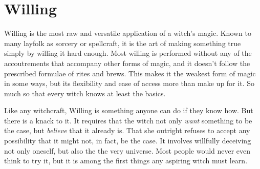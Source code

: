 \chapter{Willing}

Willing is the most raw and versatile application of a witch's magic.
Known to many layfolk as sorcery or spellcraft, it is the art of making something true simply by willing it hard enough.
Most willing is performed without any of the accoutrements that accompany other forms of magic, and it doesn't follow the prescribed formulae of rites and brews.
This makes it the weakest form of magic in some ways, but its flexibility and ease of access more than make up for it.
So much so that every witch knows at least the basics.

Like any witchcraft, Willing is something anyone can do if they know how.
But there is a knack to it.
It requires that the witch not only \emph{want} something to be the case, but \emph{believe} that it already is.
That she outright refuses to accept any possibility that it might not, in fact, be the case.
It involves willfully deceiving not only oneself, but also the the very universe.
Most people would never even think to try it, but it is among the first things any aspiring witch must learn.

